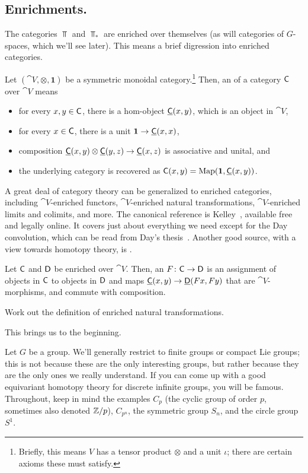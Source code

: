 \subsection*{Enrichments.}
The categories $\Top$ and $\Top_*$ are enriched over themselves (as will categories of $G$-spaces, which we'll see
later). This means a brief digression into enriched categories.
\begin{defn}
Let $(\cat V,\otimes, \boldsymbol 1)$ be a symmetric monoidal category.\footnote{Briefly, this means $V$ has a
tensor product $\otimes$ and a unit $\iota$; there are certain axioms these must satisfy.} Then, an
 of a category $\mathsf C$ over $\cat V$ means
\begin{itemize}
	\item for every $x,y\in\mathsf C$, there is a hom-object $\underline{\mathsf C}(x,y)$, which is an object in $\cat V$,
	\item for every $x\in\mathsf C$, there is a unit $\boldsymbol 1\to\underline{\mathsf C}(x,x)$,
	\item composition $\underline{\mathsf C}(x,y)\otimes\underline{\mathsf C}(y,z)\to\underline{\mathsf C}(x,z)$ is associative and unital,
	and
	\item the underlying category is recovered as $\mathsf C(x,y) = \operatorname{Map}(\boldsymbol 1, \underline{\mathsf C}(x,y))$.
\end{itemize}
\end{defn}
A great deal of category theory can be generalized to enriched categories, including $\cat V$-enriched functors,
$\cat V$-enriched natural transformations, $\cat V$-enriched limits and colimits, and more. The canonical reference
is Kelley~\cite{Kelley}, available free and legally online. It covers just about everything we need except for the
Day convolution, which can be read from Day's thesis~\cite{DayThesis}. Another good source, with a view towards homotopy theory, is \cite[Chapter 3]{RiehlCHT}.
\begin{defn}
Let $\mathsf C$ and $\mathsf D$ be enriched over $\cat V$. Then, an  $F\colon\mathsf C\to\mathsf D$ is an assignment
of objects in $\mathsf C$ to objects in $\mathsf D$ and maps $\underline{\mathsf C}(x,y)\to\underline{\mathsf D}(Fx, Fy)$ that are $\cat
V$-morphisms, and commute with composition.
\end{defn}
\begin{ex}
Work out the definition of enriched natural transformations.
\end{ex}
This brings us to the beginning.

\orbreak

Let $G$ be a group. We'll generally restrict to finite groups or compact Lie groups; this is not because these are
the only interesting groups, but rather because they are the only ones we really understand. If you can come up
with a good equivariant homotopy theory for discrete infinite groups, you will be famous. Throughout, keep in mind
the examples $C_p$ (the cyclic group of order $p$, sometimes also denoted $\mathbb Z/p$), $C_{p^n}$, the symmetric group
$S_n$, and the circle group $S^1$.

